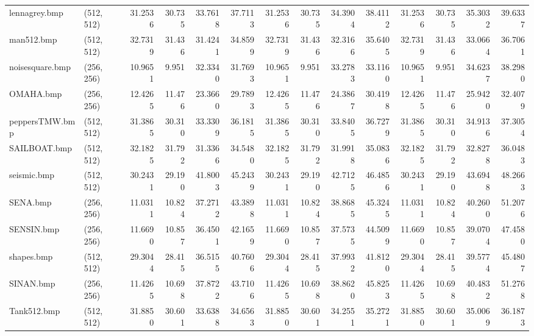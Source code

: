 \documentclass{article}
\begin{document}
\begin{table}[H]
\begin{adjustbox}{center}
\begin{tabular}{llrrrrrrrrrrrr}
     lennagrey.bmp &  (512, 512) &   31.2536 &    30.735 &   33.7618 &   37.7113 &   31.2536 &    30.735 &   34.3904 &   38.4112 &   31.2536 &    30.735 &   35.3032 &   39.6337 \\
        man512.bmp &  (512, 512) &   32.7319 &    31.436 &   31.4241 &   34.8599 &   32.7319 &    31.436 &   32.3166 &   35.6405 &   32.7319 &    31.436 &   33.0664 &   36.7061 \\
   noisesquare.bmp &  (256, 256) &   10.9651 &     9.951 &   32.3340 &   31.7693 &   10.9651 &     9.951 &   33.2783 &   33.1160 &   10.9651 &     9.951 &   34.6237 &   38.2980 \\
         OMAHA.bmp &  (256, 256) &   12.4265 &    11.476 &   23.3660 &   29.7893 &   12.4265 &    11.476 &   24.3867 &   30.4198 &   12.4265 &    11.476 &   25.9420 &   32.4079 \\
    peppersTMW.bmp &  (512, 512) &   31.3865 &    30.310 &   33.3309 &   36.1815 &   31.3865 &    30.310 &   33.8405 &   36.7279 &   31.3865 &    30.310 &   34.9136 &   37.3054 \\
      SAILBOAT.bmp &  (512, 512) &   32.1825 &    31.792 &   31.3366 &   34.5480 &   32.1825 &    31.792 &   31.9918 &   35.0836 &   32.1825 &    31.792 &   32.8278 &   36.0483 \\
       seismic.bmp &  (512, 512) &   30.2431 &    29.190 &   41.8003 &   45.2439 &   30.2431 &    29.190 &   42.7125 &   46.4856 &   30.2431 &    29.190 &   43.6948 &   48.2663 \\
          SENA.bmp &  (256, 256) &   11.0311 &    10.824 &   37.2712 &   43.3898 &   11.0311 &    10.824 &   38.8685 &   45.3245 &   11.0311 &    10.824 &   40.2600 &   51.2076 \\
        SENSIN.bmp &  (256, 256) &   11.6690 &    10.857 &   36.4501 &   42.1659 &   11.6690 &    10.857 &   37.5735 &   44.5099 &   11.6690 &    10.857 &   39.0704 &   47.4580 \\
        shapes.bmp &  (512, 512) &   29.3044 &    28.415 &   36.5155 &   40.7606 &   29.3044 &    28.415 &   37.9932 &   41.8120 &   29.3044 &    28.415 &   39.5774 &   45.4807 \\
         SINAN.bmp &  (256, 256) &   11.4265 &    10.698 &   37.8722 &   43.7106 &   11.4265 &    10.698 &   38.8620 &   45.8253 &   11.4265 &    10.698 &   40.4832 &   51.2768 \\
       Tank512.bmp &  (512, 512) &   31.8850 &    30.601 &   33.6388 &   34.6563 &   31.8850 &    30.601 &   34.2551 &   35.2721 &   31.8850 &    30.601 &   35.0069 &   36.1873 \\

\end{tabular}
\end{adjustbox}
\end{table}
\end{document}
